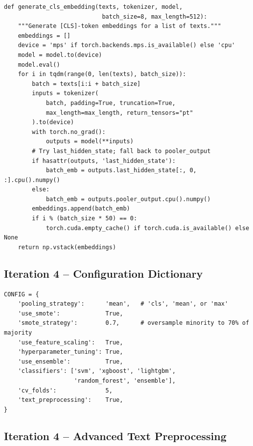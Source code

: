 \documentclass[11pt, titlepage, bibliography=totoc]{scrreprt}
\begin{document}
\begin{lstlisting}[label=lst:unified-embedding,
  caption={Unified CLS-token embedding function used in Iteration~3 to handle both standard BERT and E5 model families.}]
def generate_cls_embedding(texts, tokenizer, model,
                            batch_size=8, max_length=512):
    """Generate [CLS]-token embeddings for a list of texts."""
    embeddings = []
    device = 'mps' if torch.backends.mps.is_available() else 'cpu'
    model = model.to(device)
    model.eval()
    for i in tqdm(range(0, len(texts), batch_size)):
        batch = texts[i:i + batch_size]
        inputs = tokenizer(
            batch, padding=True, truncation=True,
            max_length=max_length, return_tensors="pt"
        ).to(device)
        with torch.no_grad():
            outputs = model(**inputs)
        # Try last_hidden_state; fall back to pooler_output
        if hasattr(outputs, 'last_hidden_state'):
            batch_emb = outputs.last_hidden_state[:, 0, :].cpu().numpy()
        else:
            batch_emb = outputs.pooler_output.cpu().numpy()
        embeddings.append(batch_emb)
        if i % (batch_size * 50) == 0:
            torch.cuda.empty_cache() if torch.cuda.is_available() else None
    return np.vstack(embeddings)
\end{lstlisting}

\subsection*{Iteration 4 -- Configuration Dictionary}

\begin{lstlisting}[label=lst:iter4-config,
  caption={Iteration~4 configuration dictionary controlling all pipeline parameters.}]
CONFIG = {
    'pooling_strategy':      'mean',   # 'cls', 'mean', or 'max'
    'use_smote':             True,
    'smote_strategy':        0.7,      # oversample minority to 70% of majority
    'use_feature_scaling':   True,
    'hyperparameter_tuning': True,
    'use_ensemble':          True,
    'classifiers': ['svm', 'xgboost', 'lightgbm',
                    'random_forest', 'ensemble'],
    'cv_folds':              5,
    'text_preprocessing':    True,
}
\end{lstlisting}

\subsection*{Iteration 4 -- Advanced Text Preprocessing}
\end{document}
